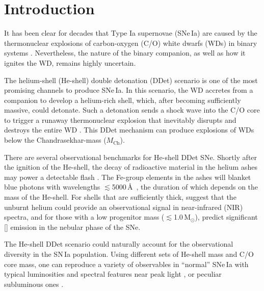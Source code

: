 \documentclass[twocolumn]{aastex631}
\newcommand{\Mch}{$M_\mathrm{Ch}$}
\begin{document}

\section{Introduction} \label{sec:intro}
It has been clear for decades that Type Ia supernovae (SNe\,Ia) are caused by the thermonuclear explosions of carbon-oxygen (C/O) white dwarfs (WDs) in binary systems \citep[see][for a review]{Maoz_2014}. Nevertheless, the nature of the binary companion, as well as how it ignites the WD, remains highly uncertain. 

The helium-shell (He-shell) double detonation (DDet) scenario is one of the most promising channels to produce SNe\,Ia. In this scenario, the WD accretes from a companion to develop a helium-rich shell, which, after becoming sufficiently massive, could detonate. Such a detonation sends a shock wave into the C/O core to trigger a runaway thermonuclear explosion that inevitably disrupts and destroys the entire WD \citep{Nomoto_1982a, Nomoto_1982b, Woosley_1986, Livne_1990, Woosley_1994, Livne_1995}. This DDet mechanism can produce explosions of WDs below the Chandrasekhar-mass (\Mch).

There are several observational benchmarks for He-shell DDet SNe. Shortly after the ignition of the He-shell, the decay of radioactive material in the helium ashes may power a detectable flash \citep{Woosley_1994,Fink_DD_2010,Kromer_DD_2010}. The Fe-group elements in the ashes will blanket blue photons with wavelengths $\lesssim$5000\,\AA\ \citep{Kromer_DD_2010}, the duration of which depends on the mass of the He-shell. For shells that are sufficiently thick, \citet{Boyle2017_Helium} suggest that the unburnt helium could provide an observational signal in near-infrared (NIR) spectra, and for those with a low progenitor mass ($\lesssim$1.0\,$\mathrm{M_\odot}$), \citet{polin_nebular_2021} predict significant [] emission in the nebular phase of the SNe.

The He-shell DDet scenario could naturally account for the observational diversity in the SN\,Ia population. Using different sets of He-shell mass and C/O core mass, one can reproduce a variety of observables in ``normal'' SNe\,Ia with typical luminosities and spectral features near peak light \citep[e.g.,][]{polin_observational_2019,Shen_2D_2021}, or peculiar subluminous ones \citep[e.g.,][]{polin_observational_2019}. 
\end{document}
